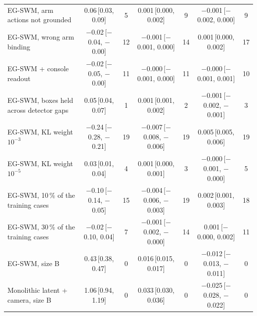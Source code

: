 \begin{tabular}{lcccccc}
EG-SWM, arm actions not grounded & 0.06\,{\scriptsize[0.03, 0.09]} & 5 & 0.001\,{\scriptsize[0.000, 0.002]} & 9 & $-$0.001\,{\scriptsize[$-$0.002, 0.000]} & 9 \\
EG-SWM, wrong arm binding & $-$0.02\,{\scriptsize[$-$0.04, $-$0.00]} & 12 & $-$0.001\,{\scriptsize[$-$0.001, 0.000]} & 14 & 0.001\,{\scriptsize[0.000, 0.002]} & 17 \\
EG-SWM + console readout & $-$0.02\,{\scriptsize[$-$0.05, $-$0.00]} & 11 & $-$0.000\,{\scriptsize[$-$0.001, 0.000]} & 11 & $-$0.000\,{\scriptsize[$-$0.001, 0.001]} & 10 \\
EG-SWM, boxes held across detector gaps & 0.05\,{\scriptsize[0.04, 0.07]} & 1 & 0.001\,{\scriptsize[0.001, 0.002]} & 2 & $-$0.001\,{\scriptsize[$-$0.002, $-$0.001]} & 3 \\
EG-SWM, KL weight $10^{-3}$ & $-$0.24\,{\scriptsize[$-$0.28, $-$0.21]} & 19 & $-$0.007\,{\scriptsize[$-$0.008, $-$0.006]} & 19 & 0.005\,{\scriptsize[0.005, 0.006]} & 19 \\
EG-SWM, KL weight $10^{-5}$ & 0.03\,{\scriptsize[0.01, 0.04]} & 4 & 0.001\,{\scriptsize[0.000, 0.001]} & 3 & $-$0.000\,{\scriptsize[$-$0.001, $-$0.000]} & 5 \\
EG-SWM, 10\,\% of the training cases & $-$0.10\,{\scriptsize[$-$0.14, $-$0.05]} & 15 & $-$0.004\,{\scriptsize[$-$0.006, $-$0.003]} & 19 & 0.002\,{\scriptsize[0.001, 0.003]} & 18 \\
EG-SWM, 30\,\% of the training cases & $-$0.02\,{\scriptsize[$-$0.10, 0.04]} & 7 & $-$0.001\,{\scriptsize[$-$0.002, $-$0.000]} & 14 & 0.001\,{\scriptsize[$-$0.000, 0.002]} & 11 \\
EG-SWM, size B & 0.43\,{\scriptsize[0.38, 0.47]} & 0 & 0.016\,{\scriptsize[0.015, 0.017]} & 0 & $-$0.012\,{\scriptsize[$-$0.013, $-$0.011]} & 0 \\
Monolithic latent + camera, size B & 1.06\,{\scriptsize[0.94, 1.19]} & 0 & 0.033\,{\scriptsize[0.030, 0.036]} & 0 & $-$0.025\,{\scriptsize[$-$0.028, $-$0.022]} & 0 \\
\bottomrule
\end{tabular}
